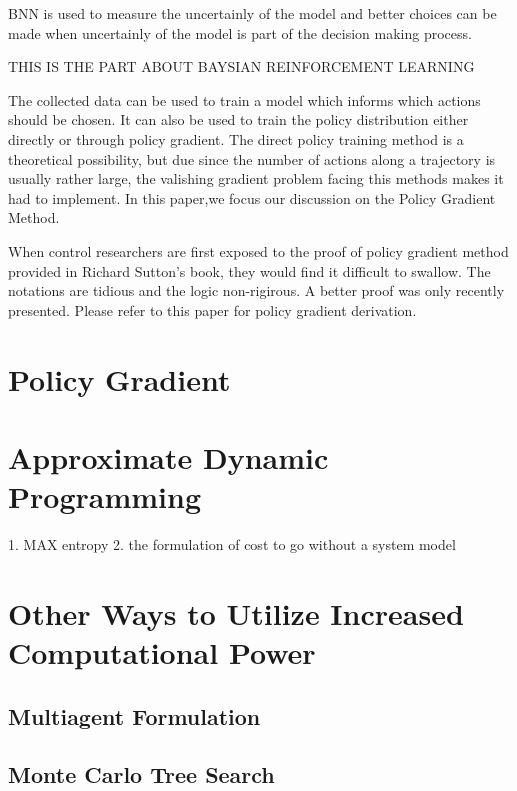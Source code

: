 \documentclass[journal]{IEEEtran}
\begin{document}
BNN is used to measure the uncertainly of the model and better choices can be made when uncertainly of the model is part of the decision making process. \cite{Blundell2015WeightUI}

THIS IS THE PART ABOUT BAYSIAN REINFORCEMENT LEARNING


The collected data can be used to train a model which informs which actions should be chosen. It can also be used to train the policy distribution either directly or through policy gradient. The direct policy training method is a theoretical possibility, but due since the number of actions along a trajectory is usually rather large, the valishing gradient problem facing this methods makes it had to implement. In this paper,we focus our discussion on the Policy Gradient Method.

When control researchers are first exposed to the proof of policy gradient method provided in Richard Sutton's book, they would find it difficult to swallow. The notations are tidious and the logic non-rigirous. A better proof was only recently presented. Please refer to this paper for policy gradient derivation. \cite{Schulman2015TrustRP}

\section{Policy Gradient}






\section{Approximate Dynamic Programming}
1. MAX entropy
2. the formulation of cost to go without a system model







\section{Other Ways to Utilize Increased Computational Power}
\subsection{Multiagent Formulation}
\subsection{Monte Carlo Tree Search}
\end{document}
